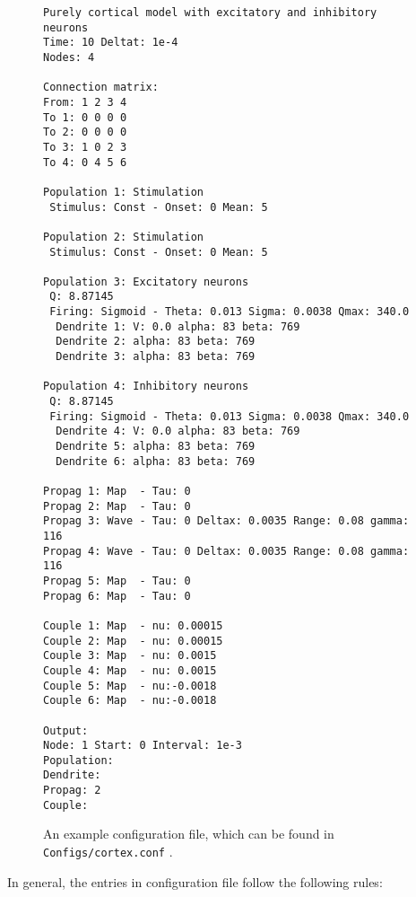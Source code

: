 \documentclass[12pt,a4paper]{article}
\newcommand{\type}[1]{ {\small\small\tt #1} }
\begin{document}
\begin{figure}\begin{center}
	\begin{lstlisting}
Purely cortical model with excitatory and inhibitory neurons
Time: 10 Deltat: 1e-4
Nodes: 4

Connection matrix:
From: 1 2 3 4
To 1: 0 0 0 0
To 2: 0 0 0 0
To 3: 1 0 2 3
To 4: 0 4 5 6

Population 1: Stimulation
 Stimulus: Const - Onset: 0 Mean: 5

Population 2: Stimulation
 Stimulus: Const - Onset: 0 Mean: 5

Population 3: Excitatory neurons
 Q: 8.87145
 Firing: Sigmoid - Theta: 0.013 Sigma: 0.0038 Qmax: 340.0
  Dendrite 1: V: 0.0 alpha: 83 beta: 769
  Dendrite 2: alpha: 83 beta: 769
  Dendrite 3: alpha: 83 beta: 769

Population 4: Inhibitory neurons
 Q: 8.87145
 Firing: Sigmoid - Theta: 0.013 Sigma: 0.0038 Qmax: 340.0
  Dendrite 4: V: 0.0 alpha: 83 beta: 769
  Dendrite 5: alpha: 83 beta: 769
  Dendrite 6: alpha: 83 beta: 769

Propag 1: Map  - Tau: 0
Propag 2: Map  - Tau: 0
Propag 3: Wave - Tau: 0 Deltax: 0.0035 Range: 0.08 gamma: 116
Propag 4: Wave - Tau: 0 Deltax: 0.0035 Range: 0.08 gamma: 116
Propag 5: Map  - Tau: 0
Propag 6: Map  - Tau: 0

Couple 1: Map  - nu: 0.00015
Couple 2: Map  - nu: 0.00015
Couple 3: Map  - nu: 0.0015
Couple 4: Map  - nu: 0.0015
Couple 5: Map  - nu:-0.0018
Couple 6: Map  - nu:-0.0018

Output:
Node: 1 Start: 0 Interval: 1e-3
Population: 
Dendrite:
Propag: 2
Couple: 
	\end{lstlisting}
\end{center}
\caption{An example configuration file, which can be found in \type{Configs/cortex.conf}.}
\end{figure}

In general, the entries in configuration file follow the following rules:
\end{document}
